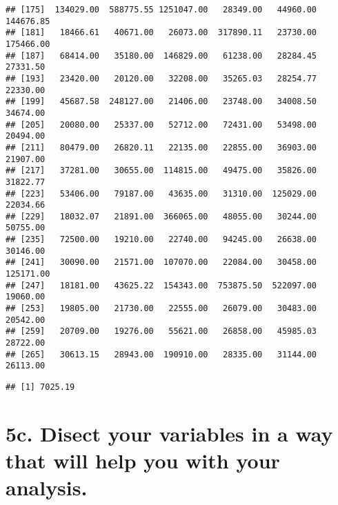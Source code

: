 \documentclass[
]{article}
\newenvironment{Shaded}{\begin{snugshade}}{\end{snugshade}}
\newcommand{\KeywordTok}[1]{\textcolor[rgb]{0.13,0.29,0.53}{\textbf{#1}}}
\newcommand{\NormalTok}[1]{#1}
\newcommand{\OperatorTok}[1]{\textcolor[rgb]{0.81,0.36,0.00}{\textbf{#1}}}
\begin{document}
\begin{verbatim}
## [175]  134029.00  588775.55 1251047.00   28349.00   44960.00  144676.85
## [181]   18466.61   40671.00   26073.00  317890.11   23730.00  175466.00
## [187]   68414.00   35180.00  146829.00   61238.00   28284.45   27331.50
## [193]   23420.00   20120.00   32208.00   35265.03   28254.77   22330.00
## [199]   45687.58  248127.00   21406.00   23748.00   34008.50   34674.00
## [205]   20080.00   25337.00   52712.00   72431.00   53498.00   20494.00
## [211]   80479.00   26820.11   22135.00   22855.00   36903.00   21907.00
## [217]   37281.00   30655.00  114815.00   49475.00   35826.00   31822.77
## [223]   53406.00   79187.00   43635.00   31310.00  125029.00   22034.66
## [229]   18032.07   21891.00  366065.00   48055.00   30244.00   50755.00
## [235]   72500.00   19210.00   22740.00   94245.00   26638.00   30146.00
## [241]   30090.00   21571.00  107070.00   22084.00   30458.00  125171.00
## [247]   18181.00   43625.22  154343.00  753875.50  522097.00   19060.00
## [253]   19805.00   21730.00   22555.00   26079.00   30483.00   20542.00
## [259]   20709.00   19276.00   55621.00   26858.00   45985.03   28722.00
## [265]   30613.15   28943.00  190910.00   28335.00   31144.00   26113.00
\end{verbatim}

\begin{Shaded}
\end{Shaded}

\begin{verbatim}
## [1] 7025.19
\end{verbatim}

\hypertarget{c.-disect-your-variables-in-a-way-that-will-help-you-with-your-analysis.}{%
\section{5c. Disect your variables in a way that will help you with your
analysis.}\label{c.-disect-your-variables-in-a-way-that-will-help-you-with-your-analysis.}}

\begin{Shaded}
\end{Shaded}
\end{document}
